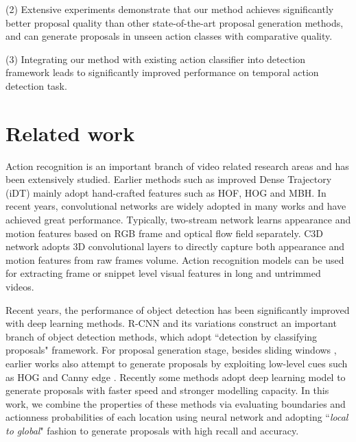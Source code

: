 \documentclass[runningheads]{llncs}
\begin{document}
(2) Extensive experiments demonstrate that our method achieves significantly better proposal quality than other state-of-the-art proposal generation methods, and can generate proposals in unseen action classes with comparative quality.

(3) Integrating our method with existing action classifier into detection framework leads to significantly improved performance on temporal action detection task.%

\vspace{-0.1cm}

\section{Related work}

Action recognition is an important branch of video related research areas and has been extensively studied. Earlier methods such as improved Dense Trajectory (iDT) \cite{dtf,wang2013action} mainly adopt hand-crafted features such as HOF, HOG and MBH. In recent years, convolutional networks are widely adopted in many works \cite{feichtenhofer2016convolutional,simonyan2014two,tran2015learning,wang2015towards} and have achieved great performance. Typically, two-stream network \cite{feichtenhofer2016convolutional,simonyan2014two,wang2015towards} learns appearance and motion features based on RGB frame and optical flow field separately. C3D network \cite{tran2015learning} adopts 3D convolutional layers to directly capture both appearance and motion features from raw frames volume.
Action recognition models can be used for extracting frame or snippet level visual features in long and untrimmed videos.


Recent years, the performance of object detection has been significantly improved with deep learning methods. R-CNN \cite{girshick2014rich} and its variations \cite{girshick2015fastt,ren2015faster} construct an important branch of object detection methods, which adopt ``detection by classifying proposals" framework.
For proposal generation stage, besides sliding windows \cite{felzenszwalb2010object}, earlier works also attempt to generate proposals by exploiting low-level cues such as HOG and Canny edge \cite{uijlings2013selective,zitnick2014edge}. Recently some methods \cite{ren2015faster,kuo2015deepbox,lin2016feature} adopt deep learning model to generate proposals with faster speed  and stronger modelling capacity.
In this work, we combine the properties of these methods via evaluating boundaries and actionness probabilities of each location using neural network and adopting ``\emph{local to global}" fashion to generate proposals with high recall and accuracy.
\end{document}

